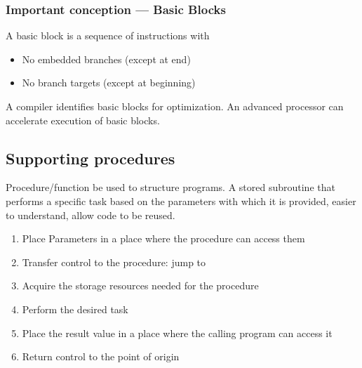 
\subsubsection{Important conception --- Basic Blocks}
A basic block is a sequence of instructions with 
\begin{itemize}
    \item\small No embedded branches (except at end)
    \item\small No branch targets (except at beginning)
\end{itemize}

A compiler identifies basic blocks for optimization. An advanced processor can accelerate execution of basic blocks. 

\subsection{Supporting procedures}
Procedure/function be used to structure programs. A stored subroutine that performs a specific task based on the parameters with which it is provided, easier to understand, allow code to be reused. 
\begin{enumerate}
    \item Place Parameters in a place where the procedure can access
    them
    \item Transfer control to the procedure: jump to
    \item Acquire the storage resources needed for the procedure
    \item Perform the desired task
    \item Place the result value in a place where the calling program can access it
    \item Return control to the point of origin
\end{enumerate}

